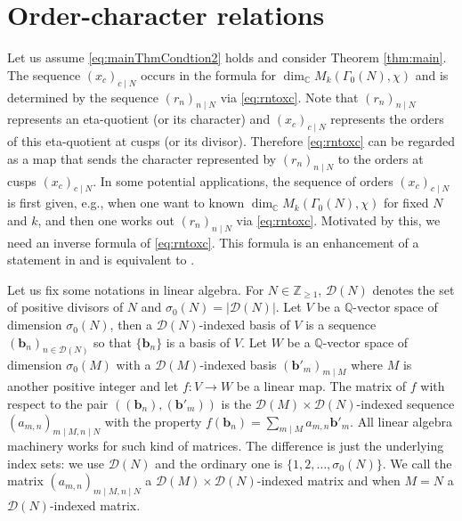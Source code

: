 \documentclass[12pt]{amsart}
\numberwithin{equation}{section}
\theoremstyle{plain}
\theoremstyle{definition}
\theoremstyle{remark}
\newcommand*\abs[1]{\lvert#1\rvert}
\newcommand\numQ{\mathbb{Q}}
\newcommand\numC{\mathbb{C}}
\newcommand\numgeq[2]{\mathbb{#1}_{\geq #2}}
\begin{document}
\section{Order-character relations}
\label{sec:Order-character relations}
Let us assume \eqref{eq:mainThmCondtion2} holds and consider Theorem \ref{thm:main}. The sequence $(x_c)_{c\mid N}$ occurs in the formula for $\dim_\numC M_k(\Gamma_0(N),\chi)$ and is determined by the sequence $(r_n)_{n \mid N}$ via \eqref{eq:rntoxc}. Note that $(r_n)_{n \mid N}$ represents an eta-quotient (or its character) and $(x_c)_{c\mid N}$ represents the orders of this eta-quotient at cusps (or its divisor). Therefore \eqref{eq:rntoxc} can be regarded as a map that sends the character represented by $(r_n)_{n \mid N}$ to the orders at cusps $(x_c)_{c\mid N}$. In some potential applications, the sequence of orders $(x_c)_{c\mid N}$ is first given, e.g., when one want to known $\dim_\numC M_k(\Gamma_0(N),\chi)$ for fixed $N$ and $k$, and then one works out $(r_n)_{n \mid N}$ via \eqref{eq:rntoxc}. Motivated by this, we need an inverse formula of \eqref{eq:rntoxc}. This formula is an enhancement of a statement in \cite[p. 129]{KM08} and is equivalent to \cite[Eq. (5.13)]{Bha17}.

Let us fix some notations in linear algebra. For $N\in\numgeq{Z}{1}$, $\mathscr{D}(N)$ denotes the set of positive divisors of $N$ and $\sigma_0(N)=\abs{\mathscr{D}(N)}$. Let $V$ be a $\numQ$-vector space of dimension $\sigma_0(N)$, then a $\mathscr{D}(N)$-indexed basis of $V$ is a sequence $(\mathbf{b}_n)_{n\in \mathscr{D}(N)}$ so that $\{\mathbf{b}_n\}$ is a basis of $V$. Let $W$ be a $\numQ$-vector space of dimension $\sigma_0(M)$ with a $\mathscr{D}(M)$-indexed basis $(\mathbf{b}'_m)_{m \mid M}$ where $M$ is another positive integer and let $f\colon V\to W$ be a linear map. The matrix of $f$ with respect to the pair $((\mathbf{b}_n),(\mathbf{b}'_m))$ is the $\mathscr{D}(M)\times\mathscr{D}(N)$-indexed sequence $(a_{m,n})_{m\mid M,n\mid N}$  with the property $f(\mathbf{b}_n)=\sum_{m \mid M}a_{m,n}\mathbf{b}'_m$. All linear algebra machinery works for such kind of matrices. The difference is just the underlying index sets: we use $\mathscr{D}(N)$ and the ordinary one is $\{1,2,\dots,\sigma_0(N)\}$. We call the matrix $(a_{m,n})_{m\mid M,n\mid N}$ a $\mathscr{D}(M)\times\mathscr{D}(N)$-indexed matrix and when $M=N$ a $\mathscr{D}(N)$-indexed matrix.
\end{document}

